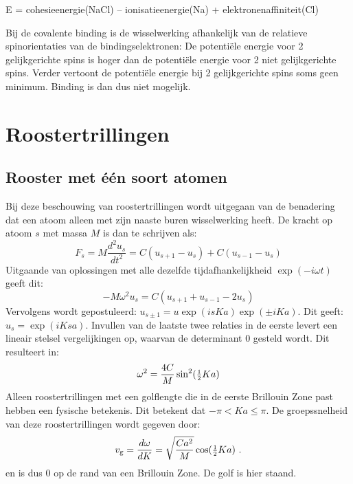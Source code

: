 \centerline{E = cohesieenergie(NaCl) -- ionisatieenergie(Na) + elektronenaffiniteit(Cl)}

Bij de covalente binding is de wisselwerking afhankelijk van de relatieve
spinorientaties van de bindingselektronen: De potenti\"ele energie voor 2
gelijkgerichte spins is hoger dan de potenti\"ele energie voor 2 niet
gelijkgerichte spins. Verder vertoont de potenti\"ele energie bij 2
gelijkgerichte spins soms geen minimum. Binding is dan dus niet mogelijk.

\section{Roostertrillingen}
\subsection{Rooster met \'e\'en soort atomen}
Bij deze beschouwing van roostertrillingen wordt uitgegaan van de benadering
dat een atoom alleen met zijn naaste buren wisselwerking heeft. De kracht op
atoom $s$ met massa $M$ is dan te schrijven als:
\[
F_s=M\frac{d^2u_s}{dt^2}=C(u_{s+1}-u_s)+C(u_{s-1}-u_s)
\]
Uitgaande van oplossingen met alle dezelfde tijdafhankelijkheid
$\exp(-i\omega t)$ geeft dit:
\[
-M\omega^2 u_s=C(u_{s+1}+u_{s-1}-2u_s)
\]
Vervolgens wordt gepostuleerd: $u_{s\pm1}=u\exp(isKa)\exp(\pm iKa)$.
\npar
Dit geeft: $u_s=\exp(iKsa)$. Invullen van de laatste twee relaties in de
eerste levert een lineair stelsel vergelijkingen op, waarvan de determinant 0
gesteld wordt. Dit resulteert in:
\[
\omega^2=\frac{4C}{M}\sin^2(\mbox{\small$\frac{1}{2}$}Ka)
\]
Alleen roostertrillingen met een golflengte die in de eerste Brillouin Zone
past hebben een fysische betekenis. Dit betekent dat $-\pi<Ka\leq\pi$.
\npar
De groepssnelheid van deze roostertrillingen wordt gegeven door:
\[
v_{\rm g}=\frac{d\omega}{dK}=\sqrt{\frac{Ca^2}{M}}\cos(\mbox{\small$\frac{1}{2}$}Ka)~.
\]
en is dus 0 op de rand van een Brillouin Zone. De golf is hier staand.

